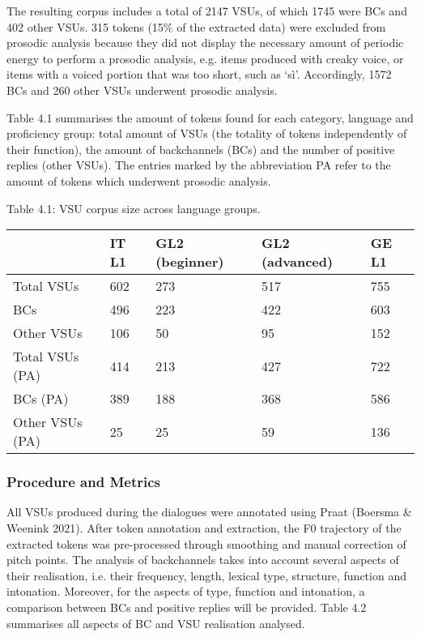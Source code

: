\begin{styleStandard}
The resulting corpus includes a total of 2147 VSUs, of which 1745 were BCs and 402 other VSUs. 315 tokens (15\% of the extracted data) were excluded from prosodic analysis because they did not display the necessary amount of periodic energy to perform a prosodic analysis, e.g. items produced with creaky voice, or items with a voiced portion that was too short, such as ‘sì’. Accordingly, 1572 BCs and 260 other VSUs underwent prosodic analysis. 
\end{styleStandard}

\begin{styleStandard}
Table 4.1 summarises the amount of tokens found for each category, language and proficiency group: total amount of VSUs (the totality of tokens independently of their function), the amount of backchannels (BCs) and the number of positive replies (other VSUs). The entries marked by the abbreviation PA refer to the amount of tokens which underwent prosodic analysis.
\end{styleStandard}

\begin{stylelsTableHeading}
Table 4.1: VSU corpus size across language groups.
\end{stylelsTableHeading}

\begin{flushleft}
\tablefirsthead{}
\tablehead{}
\tabletail{}
\tablelasttail{}
\begin{supertabular}{m{1.2712599in}m{0.50045985in}m{1.1879599in}m{1.2337599in}m{0.48025987in}}
\hline
 &
IT L1 &
GL2 (beginner) &
GL2 (advanced) &
GE L1\\\hline
Total VSUs &
602 &
273 &
517 &
755\\
BCs &
496 &
223 &
422 &
603\\
Other VSUs &
106 &
50 &
95 &
152\\
Total VSUs (PA) &
414 &
213 &
427 &
722\\
BCs (PA) &
389 &
188 &
368 &
586\\
Other VSUs (PA) &
25 &
25 &
59 &
136\\\hline
\end{supertabular}
\end{flushleft}
\subsubsection{Procedure and Metrics}
\hypertarget{Toc191305949}{}\begin{styleStandard}
All VSUs produced during the dialogues were annotated using Praat (Boersma \& Weenink 2021). After token annotation and extraction, the F0 trajectory of the extracted tokens was pre-processed through smoothing and manual correction of pitch points. The analysis of backchannels takes into account several aspects of their realisation, i.e. their frequency, length, lexical type, structure, function and intonation. Moreover, for the aspects of type, function and intonation, a comparison between BCs and positive replies will be provided. Table 4.2 summarises all aspects of BC and VSU realisation analysed.
\end{styleStandard}

